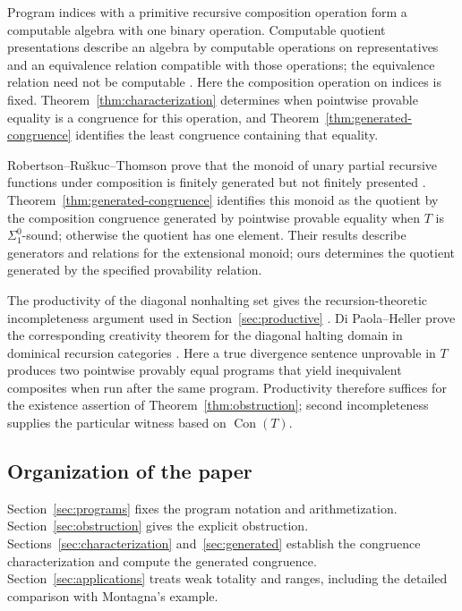 \documentclass[11pt]{article}
\newcommand{\Con}{\operatorname{Con}}
\begin{document}
Program indices with a primitive recursive composition operation form
a computable algebra with one binary operation. Computable quotient
presentations describe an algebra by computable operations on
representatives and an equivalence relation compatible with those
operations; the equivalence relation need not be computable
\cite[p.~9]{GodziszewskiHamkins}.
Here the composition operation on indices is fixed.
Theorem~\ref{thm:characterization} determines when pointwise provable
equality is a congruence for this operation, and
Theorem~\ref{thm:generated-congruence} identifies the least congruence
containing that equality.

Robertson--Ru\v{s}kuc--Thomson prove that the monoid of unary partial
recursive functions under composition is finitely generated but not
finitely presented
\cite[Theorems~2.2--2.3, pp.~168--169]{RobertsonRuskucThomson}.
Theorem~\ref{thm:generated-congruence} identifies this monoid as the
quotient by the composition congruence generated by pointwise provable
equality when $T$ is $\Sigma^0_1$-sound; otherwise the quotient has one
element. Their results describe generators and relations for the
extensional monoid; ours determines the quotient generated by the
specified provability relation.

The productivity of the diagonal nonhalting set gives the
recursion-theoretic incompleteness argument used in
Section~\ref{sec:productive} \cite[Section~5.3, p.~136]{GallierQuaintance}.
Di Paola--Heller prove the corresponding creativity theorem for the
diagonal halting domain in dominical recursion categories
\cite[Theorem~8.5, pp.~622--623]{DiPaolaHeller}.
Here a true divergence sentence unprovable in $T$ produces two pointwise
provably equal programs that yield inequivalent composites when run
after the same program. Productivity therefore suffices for the existence
assertion of Theorem~\ref{thm:obstruction}; second incompleteness supplies
the particular witness based on $\Con(T)$.

\subsection{Organization of the paper}\label{sec:organization}

Section~\ref{sec:programs} fixes the program notation and arithmetization.
Section~\ref{sec:obstruction} gives the explicit obstruction.
Sections~\ref{sec:characterization} and~\ref{sec:generated} establish
the congruence characterization and compute the generated congruence.
Section~\ref{sec:applications} treats weak totality and ranges,
including the detailed comparison with Montagna's example.
\end{document}
